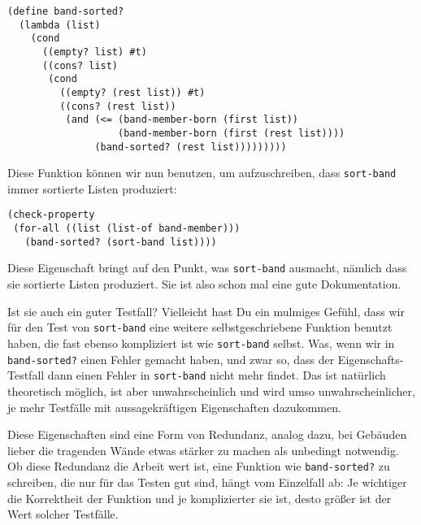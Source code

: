 \begin{lstlisting}
(define band-sorted?
  (lambda (list)
    (cond
      ((empty? list) #t)
      ((cons? list)
       (cond
         ((empty? (rest list)) #t)
         ((cons? (rest list))
          (and (<= (band-member-born (first list))
                   (band-member-born (first (rest list))))
               (band-sorted? (rest list)))))))))
\end{lstlisting}
%
Diese Funktion können wir nun benutzen, um aufzuschreiben, dass
\lstinline{sort-band} immer sortierte Listen produziert:
%
\begin{lstlisting}
(check-property
 (for-all ((list (list-of band-member)))
   (band-sorted? (sort-band list))))
\end{lstlisting}
%
Diese Eigenschaft bringt auf den Punkt, was \lstinline{sort-band}
ausmacht, nämlich dass sie sortierte Listen produziert.  Sie ist also
schon mal eine gute Dokumentation.

Ist sie auch ein guter Testfall?  Vielleicht hast Du ein mulmiges
Gefühl, dass wir für den Test von \lstinline{sort-band} eine weitere
selbstgeschriebene Funktion benutzt haben, die fast ebenso kompliziert
ist wie \lstinline{sort-band} selbst.  Was, wenn wir in
\lstinline{band-sorted?} einen Fehler gemacht haben, und zwar so,
dass der Eigenschafts-Testfall dann einen Fehler in
\lstinline{sort-band} nicht mehr findet.  Das ist natürlich
theoretisch möglich, ist aber unwahrscheinlich und wird umso
unwahrscheinlicher, je mehr Testfälle mit aussagekräftigen
Eigenschaften dazukommen.

Diese Eigenschaften sind eine Form von Redundanz,
analog dazu, bei Gebäuden lieber die tragenden Wände etwas stärker zu
machen als unbedingt notwendig.  Ob diese Redundanz die Arbeit wert
ist, eine Funktion wie \lstinline{band-sorted?} zu schreiben, die nur
für das Testen gut sind, hängt vom Einzelfall ab: Je wichtiger die
Korrektheit der Funktion und je komplizierter sie ist, desto größer
ist der Wert solcher Testfälle.

